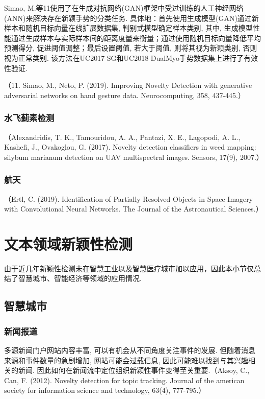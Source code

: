 \documentclass{Style/aas}
\begin{document}
\begin{multicols}{2}
  Simao, M.等11使用了在生成对抗网络(GAN)框架中受过训练的人工神经网络(ANN)来解决存在新颖手势的分类任务. 具体地：首先使用生成模型(GAN)通过新样本和随机目标向量在线扩展数据集, 判别式模型确定样本类别, 其中, 生成模型性能通过生成样本与实际样本间的距离度量来衡量；通过使用随机目标向量降低平均预测得分, 促进阈值调整；最后设置阈值, 若大于阈值, 则将其视为新颖类别, 否则视为正常类别. 该方法在UC2017 SG和UC2018 DualMyo手势数据集上进行了有效性验证.

  （11.	Simao, M., Neto, P. (2019). Improving Novelty Detection with generative adversarial networks on hand gesture data. Neurocomputing, 358, 437-445.）

  \subsubsection{水飞蓟素检测}
  （Alexandridis, T. K., Tamouridou, A. A., Pantazi, X. E., Lagopodi, A. L., Kashefi, J., Ovakoglou, G. (2017). Novelty detection classifiers in weed mapping: silybum marianum detection on UAV multispectral images. Sensors, 17(9), 2007.）

  \subsubsection{航天}
  （Ertl, C. (2019). Identification of Partially Resolved Objects in Space Imagery with Convolutional Neural Networks. The Journal of the Astronautical Sciences.）


  \section{文本领域新颖性检测}
  由于近几年新颖性检测未在智慧工业以及智慧医疗城市加以应用，因此本小节仅总结了智慧城市、智能经济等领域的应用情况.

  \subsection{智慧城市}
  \subsubsection{新闻报道}
  多源新闻门户网站内容丰富, 可以有机会从不同角度关注事件的发展. 但随着消息来源和事件数量的急剧增加, 网站可能会过载信息, 因此可能难以找到与其兴趣相关的新闻. 因此如何在新闻流中定位组织新颖性事件变得至关重要.（Aksoy, C., Can, F. (2012). Novelty detection for topic tracking. Journal of the american society for information science and technology, 63(4), 777-795.）


\end{multicols}
\end{document}
